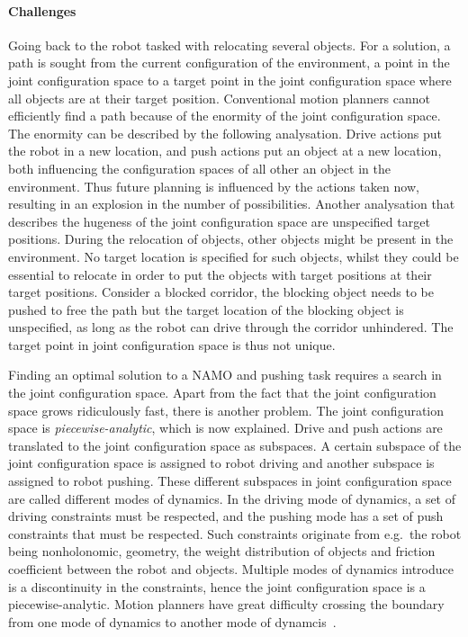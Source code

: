 \paragraph{Challenges}
Going back to the robot tasked with relocating several objects. For a solution, a path is sought from the current configuration of the environment, a point in the joint configuration space to a target point in the joint configuration space where all objects are at their target position. Conventional motion planners cannot efficiently find a path because of the enormity of the joint configuration space. The enormity can be described by the following analysation. Drive actions put the robot in a new location, and push actions put an object at a new location, both influencing the configuration spaces of all other an object in the environment. Thus future planning is influenced by the actions taken now, resulting in an explosion in the number of possibilities. Another analysation that describes the hugeness of the joint configuration space are unspecified target positions. During the relocation of objects, other objects might be present in the environment. No target location is specified for such objects, whilst they could be essential to relocate in order to put the objects with target positions at their target positions. Consider a blocked corridor, the blocking object needs to be pushed to free the path but the target location of the blocking object is unspecified, as long as the robot can drive through the corridor unhindered. The target point in joint configuration space is thus not unique.\bs

Finding an optimal solution to a \ac{NAMO} and pushing task requires a search in the joint configuration space. Apart from the fact that the joint configuration space grows ridiculously fast, there is another problem. The joint configuration space is \textit{piecewise-analytic}, which is now explained. Drive and push actions are translated to the joint configuration space as subspaces. A certain subspace of the joint configuration space is assigned to robot driving and another subspace is assigned to robot pushing. These different subspaces in joint configuration space are called different modes of dynamics. In the driving mode of dynamics, a set of driving constraints must be respected, and the pushing mode has a set of push constraints that must be respected. Such constraints originate from e.g.~the robot being nonholonomic, geometry, the weight distribution of objects and friction coefficient between the robot and objects. Multiple modes of dynamics introduce is a discontinuity in the constraints, hence the joint configuration space is a piecewise-analytic. Motion planners have great difficulty crossing the boundary from one mode of dynamics to another mode of dynamcis~\cite{vega-brown_asymptotically_2020}.\bs

